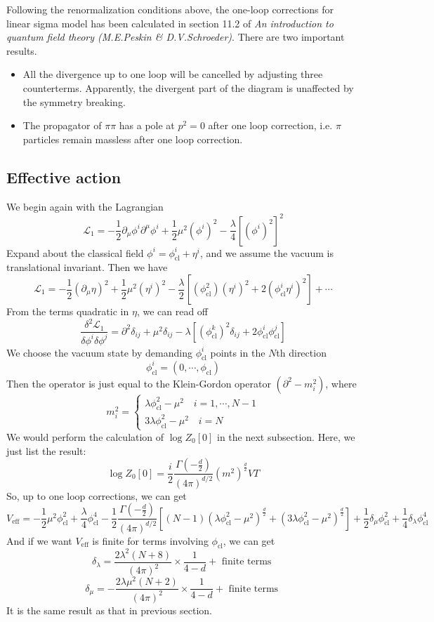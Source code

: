\noindent
Following the renormalization conditions above, the one-loop corrections for linear sigma model has been calculated in section 11.2 of \emph{An introduction to quantum field theory (M.E.Peskin \& D.V.Schroeder)}. There are two important results.
\begin{itemize}
\item All the divergence up to one loop will be cancelled by adjusting three counterterms. Apparently, the divergent part of the diagram is unaffected by the symmetry breaking.
\item The propagator of $\pi\pi$ has a pole at $p^2 = 0$ after one loop correction, i.e. $\pi$ particles remain massless after one loop correction.
\end{itemize}

\subsection{Effective action}
We begin again with the Lagrangian
\[\mathcal{L}_1 = -\frac{1}{2} \partial_{\mu} \phi^i \partial^{\mu}\phi^i + \frac{1}{2} \mu^2 (\phi^i)^2 - \frac{\lambda}{4} [(\phi^i)^2]^2\]
Expand about the classical field $\phi^i = \phi_{\mathrm{cl}}^i + \eta^i$, and we assume the vacuum is translational invariant. Then we have
\[\mathcal{L}_1 = -\frac{1}{2}(\partial_{\mu}\eta)^2 + \frac{1}{2}\mu^2(\eta^i)^2 - \frac{\lambda}{2}[(\phi_{\mathrm{cl}}^2)(\eta^i)^2+ 2(\phi_{\mathrm{cl}}^i\eta^i)^2] + \cdots\]
From the terms quadratic in $\eta$, we can read off
\[\frac{\delta^2 \mathcal{L}_1}{\delta\phi^i\delta\phi^j} = \partial^2\delta_{ij} + \mu^2\delta_{ij} - \lambda[(\phi_{\mathrm{cl}}^k)^2\delta_{ij} + 2\phi_{\mathrm{cl}}^i \phi_{\mathrm{cl}}^j]\]
We choose the vacuum state by demanding $\phi_{\mathrm{cl}}^i$ points in the $N$th direction
\[\phi_{\mathrm{cl}}^i = (0,\cdots,\phi_{\mathrm{cl}})\]
Then the operator is just equal to the Klein-Gordon operator $(\partial^2-m_i^2)$, where
\[m_i^2 = \begin{cases} \lambda\phi_{\mathrm{cl}}^2-\mu^2 \quad i=1,\cdots,N-1 \\ 3\lambda\phi_{\mathrm{cl}}^2-\mu^2 \quad i=N \end{cases}\]
We would perform the calculation of $\log Z_0[0]$ in the next subsection. Here, we just list the result:
\[\log Z_0[0] = \frac{i}{2}\frac{\Gamma(-\frac{d}{2})}{(4\pi)^{d/2}}(m^2)^{\frac{d}{2}}VT\]
So, up to one loop corrections, we can get
\[V_{\mathrm{eff}} = -\frac{1}{2} \mu^2 \phi_{\mathrm{cl}}^2 + \frac{\lambda}{4} \phi_{\mathrm{cl}}^4 - \frac{1}{2}\frac{\Gamma(-\frac{d}{2})}{(4\pi)^{d/2}}[(N-1)(\lambda\phi_{\mathrm{cl}}^2-\mu^2)^{\frac{d}{2}} + (3\lambda\phi_{\mathrm{cl}}^2-\mu^2)^{\frac{d}{2}}] + \frac{1}{2}\delta_{\mu}\phi_{\mathrm{cl}}^2 + \frac{1}{4}\delta_{\lambda}\phi_{\mathrm{cl}}^4\]
And if we want $V_{\mathrm{eff}}$ is finite for terms involving $\phi_{\mathrm{cl}}$, we can get
\[\delta_{\lambda} = \frac{2\lambda^2(N+8)}{(4\pi)^2} \times \frac{1}{4-d} + \mbox{ finite terms }\]
\[\delta_{\mu} = -\frac{2\lambda\mu^2(N+2)}{(4\pi)^2} \times \frac{1}{4-d} + \mbox{ finite terms }\]
It is the same result as that in previous section.

